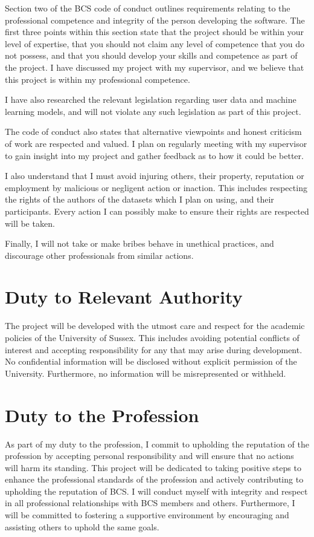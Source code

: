 \documentclass[twocolumn]{report}
\begin{document}
Section two of the BCS code of conduct outlines requirements relating to the professional competence and integrity of the person developing the software. The first three points within this section state that the project should be within your level of expertise, that you should not claim any level of competence that you do not possess, and that you should develop your skills and competence as part of the project. I have discussed my project with my supervisor, and we believe that this project is within my professional competence.

I have also researched the relevant legislation regarding user data and machine learning models, and will not violate any such legislation as part of this project. 

The code of conduct also states that alternative viewpoints and honest criticism of work are respected and valued. I plan on regularly meeting with my supervisor to gain insight into my project and gather feedback as to how it could be better. 

I also understand that I must avoid injuring others, their property, reputation or employment by malicious or negligent action or inaction. This includes respecting the rights of the authors of the datasets which I plan on using, and their participants. Every action I can possibly make to ensure their rights are respected will be taken. 

Finally, I will not take or make bribes behave in unethical practices, and discourage other professionals from similar actions.  

\section{Duty to Relevant Authority}   

The project will be developed with the utmost care and respect for the academic policies of the University of Sussex. This includes avoiding potential conflicts of interest and accepting responsibility for any that may arise during development. No confidential information will be disclosed without explicit permission of the University. Furthermore, no information will be misrepresented or withheld. 

\section{Duty to the Profession}   

As part of my duty to the profession, I commit to upholding the reputation of the profession by accepting personal responsibility and will ensure that no actions will harm its standing. This project will be dedicated to taking positive steps to enhance the professional standards of the profession and actively contributing to upholding the reputation of BCS. I will conduct myself with integrity and respect in all professional relationships with BCS members and others. Furthermore, I will be committed to fostering a supportive environment by encouraging and assisting others to uphold the same goals. 
\end{document}
